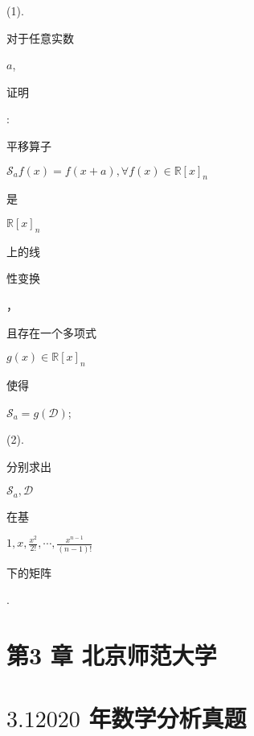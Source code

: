 \documentclass[10pt]{article}
\begin{document}
(1). \begin{CJK}{UTF8}{mj}对于任意实数\end{CJK} $a$, \begin{CJK}{UTF8}{mj}证明\end{CJK}: \begin{CJK}{UTF8}{mj}平移算子\end{CJK} $\mathscr{S}_{a} f(x)=f(x+a), \forall f(x) \in \mathbb{R}[x]_{n}$ \begin{CJK}{UTF8}{mj}是\end{CJK} $\mathbb{R}[x]_{n}$ \begin{CJK}{UTF8}{mj}上的线\end{CJK} \begin{CJK}{UTF8}{mj}性变换\end{CJK}，\begin{CJK}{UTF8}{mj}且存在一个多项式\end{CJK} $g(x) \in \mathbb{R}[x]_{n}$ \begin{CJK}{UTF8}{mj}使得\end{CJK} $\mathscr{S}_{a}=g(\mathscr{D})$;

(2). \begin{CJK}{UTF8}{mj}分别求出\end{CJK} $\mathscr{S}_{a}, \mathscr{D}$ \begin{CJK}{UTF8}{mj}在基\end{CJK} $1, x, \frac{x^{2}}{2 !}, \cdots, \frac{x^{n-1}}{(n-1) !}$ \begin{CJK}{UTF8}{mj}下的矩阵\end{CJK}.

\section{第3 章 北京师范大学}
\section{$3.12020$ 年数学分析真题}
\end{document}
